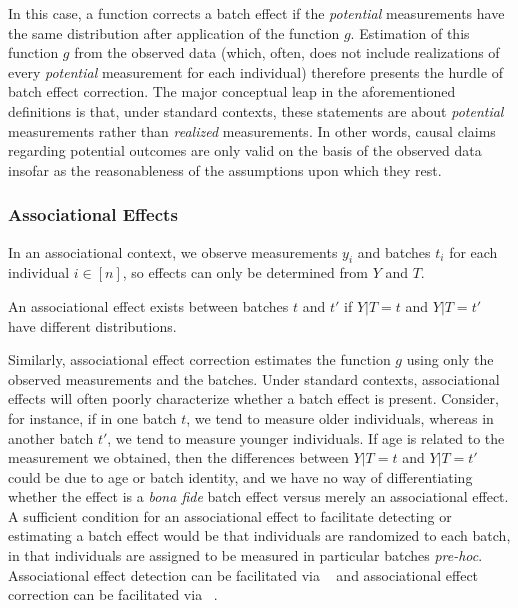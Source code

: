 {{In this case, a function corrects a batch effect if the \textit{potential} measurements have the same distribution after application of the function $g$. Estimation of this function $g$ from the observed data (which, often, does not include realizations of every \textit{potential} measurement for each individual) therefore presents the hurdle of batch effect correction. The major conceptual leap in the aforementioned definitions is that, under standard contexts, these statements are about \textit{potential} measurements rather than \textit{realized} measurements. In other words, causal claims regarding potential outcomes are only valid on the basis of the observed data insofar as the reasonableness of the assumptions upon which they rest.

\subsubsection{Associational Effects}

In an associational context, we observe measurements $y_i$ and batches $t_i$ for each individual $i \in [n]$, so effects can only be determined from $Y$ and $T$. 

\begin{flushleft}\begin{definition}
An associational effect exists between batches $t$ and $t'$ if $Y | T = t$ and $Y | T = t'$ have different distributions.
\label{def:ass_site_effect_informal}
\end{definition}
\end{flushleft}

Similarly, associational effect correction estimates the function $g$ using only the observed measurements and the batches. Under standard contexts, associational effects will often poorly characterize whether a batch effect is present. Consider, for instance, if in one batch $t$, we tend to measure older individuals, whereas in another batch $t'$, we tend to measure younger individuals. If age is related to the measurement we obtained, then the differences between $Y | T = t$ and $Y | T = t'$ could be due to age or batch identity, and we have no way of differentiating whether the effect is a \textit{bona fide} batch effect versus merely an associational effect. A sufficient condition for an associational effect to facilitate detecting or estimating a batch effect would be that individuals are randomized to each batch, in that individuals are assigned to be measured in particular batches \textit{pre-hoc}. Associational effect detection can be facilitated via \Dcorr~\cite{Szekely2007Dec} and associational effect correction can be facilitated via \Combat~\cite{Johnson2007Jan}.

}}
